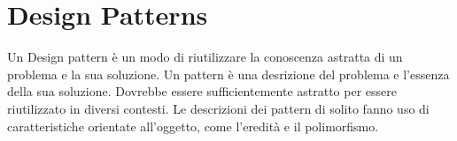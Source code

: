 \chapter{Design Patterns}
Un Design pattern è un modo di riutilizzare la conoscenza astratta di un problema e la
sua soluzione. Un pattern è una desrizione del problema e l'essenza della sua soluzione.
Dovrebbe essere sufficientemente astratto per essere riutilizzato in diversi contesti.
Le descrizioni dei pattern di solito fanno uso di caratteristiche orientate all'oggetto,
come l'eredità e il polimorfismo.